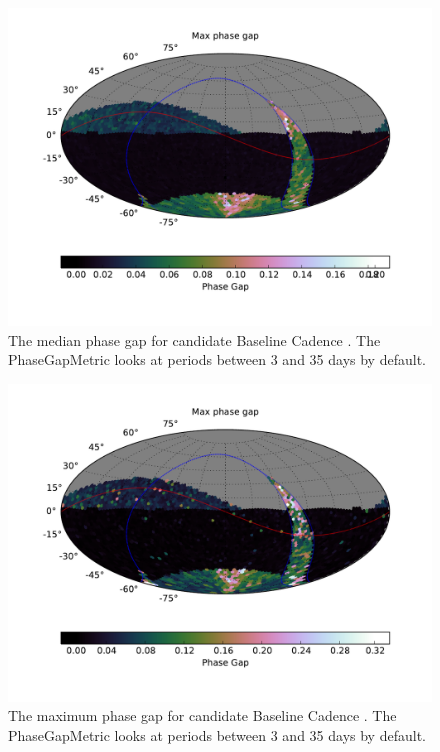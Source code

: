 \begin{figure}[tbh!]
\includegraphics{figs/variables/enigma_1189_Phase_Gap_MedianGap_OPSI_SkyMap.pdf}
\caption{The median phase gap for candidate Baseline Cadence .
The PhaseGapMetric looks at periods between 3 and 35 days by default.}
\label{fig:enigmaMedianGap}
\end{figure}

\begin{figure}[tbh!]
\includegraphics{figs/variables/enigma_1189_Phase_Gap_LargestGap_OPSI_SkyMap.pdf}
\caption{The maximum phase gap for candidate Baseline Cadence .
The PhaseGapMetric looks at periods between 3 and 35 days by default.}
\label{fig:enigmaMaxGap}
\end{figure}

